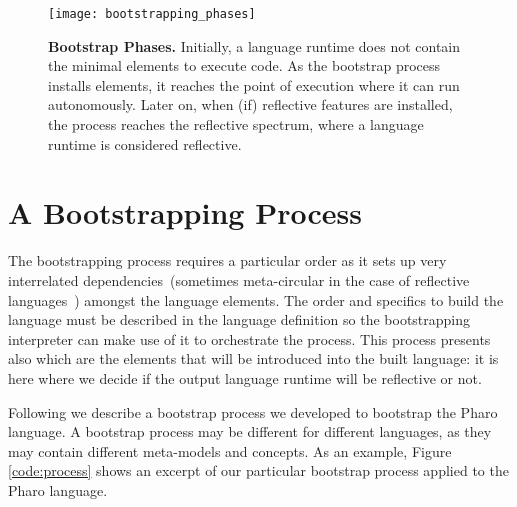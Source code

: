 

\begin{figure}[ht]
\center
\texttt{[image: bootstrapping\_phases]}
\caption{\textbf{Bootstrap Phases.} Initially, a language runtime does not contain the minimal elements to execute code. As the bootstrap process installs elements, it reaches the point of execution where it can run autonomously. Later on, when (if) reflective features are installed, the process reaches the reflective spectrum, where a language runtime is considered reflective.\label{fig:phases}}
\end{figure}

%

\section{A Bootstrapping Process}
The bootstrapping process requires a particular order as it sets up very interrelated dependencies~(sometimes meta-circular in the case of reflective languages~\cite{Stra14a,Chib96a,Maes87a,Smit84a}) amongst the language elements. The order and specifics to build the language must be described in the language definition so the bootstrapping interpreter can make use of it to orchestrate the process. This process presents also which are the elements that will be introduced into the built language: it is here where we decide if the output language runtime will be reflective or not.

Following we describe a bootstrap process we developed to bootstrap the Pharo language. A bootstrap process may be different for different languages, as they may contain different meta-models and concepts. As an example, Figure \ref{code:process} shows an excerpt of our particular bootstrap process applied to the Pharo language.

